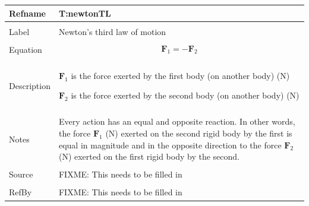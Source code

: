 \documentclass[12pt]{article}
\begin{document}
\noindent \begin{minipage}{\textwidth}
\begin{tabular}{p{} p{}}
\toprule \textbf{Refname} & \textbf{T:newtonTL}
\label{T:newtonTL}
\\ \midrule \\
Label & Newton's third law of motion
\\ \midrule \\
Equation & \begin{dmath}
           {\mathbf{F}_{1}}=-{\mathbf{F}_{2}}
           \end{dmath}
\\ \midrule \\
Description & \begin{symbDescription}
              \item{${\mathbf{F}_{1}}$ is the force exerted by the first body (on another body) (N)}
              \item{${\mathbf{F}_{2}}$ is the force exerted by the second body (on another body) (N)}
              \end{symbDescription}
\\ \midrule \\
Notes & Every action has an equal and opposite reaction. In other words, the force ${\mathbf{F}_{1}}$ (N) exerted on the second rigid body by the first is equal in magnitude and in the opposite direction to the force ${\mathbf{F}_{2}}$ (N) exerted on the first rigid body by the second.
\\ \midrule \\
Source & FIXME: This needs to be filled in
\\ \midrule \\
RefBy & FIXME: This needs to be filled in
\\ \bottomrule \end{tabular}
\end{minipage}\\
~\newline
\end{document}
